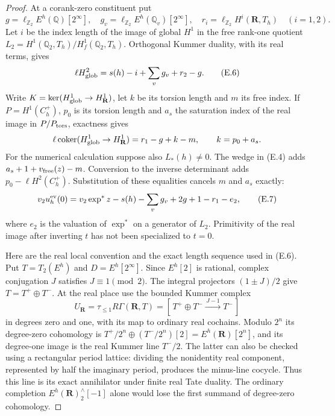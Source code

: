 \documentclass[11pt]{article}
\theoremstyle{definition}
\theoremstyle{remark}
\newcommand{\Q}{\mathbb Q}
\newcommand{\Z}{\mathbb Z}
\begin{document}
\begin{proof}\leavevmode
At a corank-zero constituent put
\[
 g=\ell_{\Z_2}E^h(\Q)[2^\infty],\quad
 g_v=\ell_{\Z_2}E^h(\Q_v)[2^\infty],\quad
 r_i=\ell_{\Z_2}H^i(\mathbf R,T_h)\quad(i=1,2).
\]
Let $i$ be the index length of the image of global $H^1$ in the
free rank-one quotient $L_2=H^1(\Q_2,T_h)/H_f^1(\Q_2,T_h)$.
Orthogonal Kummer duality, with its real terms, gives
\[
 \ell H^2_{\rm glob}=s(h)-i+\sum_v g_v+r_2-g.                     \tag{E.6}
\]
Write $K=\ker(H^1_{\rm glob}\to H^1_{\mathbf R})$, let $k$ be its
torsion length and $m$ its free index. If $P=H^1(C_h^+)$, $p_0$ is
its torsion length and $a_s$ the saturation index of the real image
in $P/P_{\rm tors}$, exactness gives
\[
 \ell\operatorname{coker}(H^1_{\rm glob}\to H^1_{\mathbf R})
       =r_1-g+k-m,\qquad k=p_0+a_s.
\]
For the numerical calculation suppose also $L_*(h)\ne0$.
The wedge in (E.4) adds $a_s+1+v_{\rm free}(z)-m$.
Conversion to the inverse determinant adds $p_0-\ell H^2(C_h^+)$.
Substitution of these equalities cancels $m$ and $a_s$ exactly:
\[
 v_2u_h^{\rm ev}(0)
 =v_2\exp^*z-s(h)-\sum_v g_v+2g+1-r_1-e_2,                      \tag{E.7}
\]
where $e_2$ is the valuation of $\exp^*$ on a generator of $L_2$.
Primitivity of the real image after inverting $t$ has not been
specialized to $t=0$.

Here are the real local convention and the exact length sequence used
in (E.6). Put $T=T_2(E^h)$ and $D=E^h[2^\infty]$. Since $E^h[2]$ is
rational, complex conjugation $J$ satisfies $J\equiv1\pmod2$.
The integral projectors $(1\pm J)/2$ give $T=T^+\oplus T^-$.
At the real place use the bounded Kummer complex
\[
 U_{\mathbf R}=\tau_{\le1}R\Gamma(\mathbf R,T)
   =[\,T^+\oplus T^-\xrightarrow{\,J-1\,}T^-\,]
\]
in degrees zero and one, with its map to ordinary real cochains.
Modulo $2^n$ its degree-zero cohomology is
$T^+/2^n\oplus(T^-/2^n)[2]=E^h(\mathbf R)[2^n]$, and its degree-one
image is the real Kummer line $T^-/2$. The latter can also be checked
using a rectangular period lattice: dividing the nonidentity real
component, represented by half the imaginary period, produces the
minus-line cocycle. Thus this line is its exact annihilator under
finite real Tate duality. The ordinary completion
$E^h(\mathbf R)^\wedge_2[-1]$ alone would lose the first summand of
degree-zero cohomology.


\end{proof}
\end{document}
